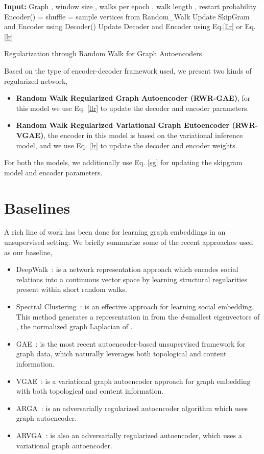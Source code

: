 \documentclass{article}
\begin{document}
\begin{algorithm}
\begin{algorithmic}
\State \textbf{Input:} Graph , window size , walks per epoch , walk length , restart probability \\

\State  Encoder()
\State  = shuffle
\State  = sample  vertices from 
\State  Random\_Walk
\State 
\State Update SkipGram and Encoder using 
\EndFor
\EndFor
\EndFor
\State  Decoder()
\State Update Decoder and Encoder using Eq.\ref{llr} or Eq.\ref{lr}
\caption{Regularization through Random Walk for Graph Autoencoders}
\label{alg:algorithm}
\end{algorithmic}
\end{algorithm}

Based on the type of encoder-decoder framework used, we present two kinds of regularized network,
\begin{itemize}
    \item \textbf{Random Walk Regularized Graph Autoencoder (RWR-GAE)}, for this model we use Eq. \ref{llr} to update the decoder and encoder parameters.
    \item \textbf{Random Walk Regularized Variational Graph Eutoencoder (RWR-VGAE)}, the encoder in this model is based on the variational inference model, and we use Eq. \ref{lr} to update the decoder and encoder weights.
\end{itemize}
For both the models, we additionally use Eq. \ref{sg} for updating the skipgram model and encoder parameters.
\section{Baselines}
A rich line of work has been done for learning graph embeddings in an unsupervised setting. We briefly summarize some of the recent approaches used as our baseline,
\begin{itemize}
\item DeepWalk~\cite{perozzi2014deepwalk}: is a network representation
approach which encodes social relations into
a continuous vector space by learning structural regularities
present within short random walks.
\item Spectral Clustering~\cite{tang2011leveraging}: is an effective
approach for learning social embedding. This method generates a representation in  from the \textit{d}-smallest eigenvectors of , the normalized graph Laplacian of .
\item GAE~\cite{vgae}: is the most recent
autoencoder-based unsupervised framework for graph
data, which naturally leverages both topological and
content information.
\item VGAE~\cite{vgae}: is a variational graph
autoencoder approach for graph embedding with both
topological and content information.
\item ARGA~\cite{argae}: is an adversarially regularized autoencoder
algorithm which uses graph autoencoder.
\item ARVGA~\cite{argae}: is also an adversarially regularized autoencoder, which uses a variational graph autoencoder.
\end{itemize}
\end{document}

